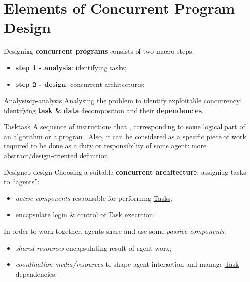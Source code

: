 \chapter{Elements of Concurrent Program Design}\label{chap:ed_elements_of_concurrent_program_design} %
Designing \textbf{concurrent programs} consists of two macro steps:
\begin{itemize}
    \item \textbf{step 1 - analysis}: identifying tasks;
    \item \textbf{step 2 - design}: concurrent architectures;
\end{itemize}
%
\begin{definition}{Analysis}{cp-analysis}
   Analyzing the problem to identify exploitable concurrency: identifying \textbf{task \& data} decomposition and their \textbf{dependencies}.
    \begin{definition}{Task}{task}
        A sequence of instructions that , corresponding to some logical part of an algorithm or a program.
        Also, it can be considered as a specific piece of work required to be done as a duty or responsibility of some agent: more abstract/design-oriented definition.
    \end{definition}
\end{definition}
\begin{definition}{Design}{cp-design}
    Choosing a suitable \textbf{concurrent architecture}, assigning tasks to ``agents'':
    \begin{itemize}
        \item \textit{active components} responsible for performing \hyperref[def:task]{Tasks};
        \item encapsulate login \& control of \hyperref[def:task]{Task} execution;
    \end{itemize}
    In order to work together, agents share and use some \textit{passive components}:
    \begin{itemize}
        \item \textit{shared resources} encapsulating result of agent work;
        \item \textit{coordination media/resources} to shape agent interaction and manage \hyperref[def:task]{Task} dependencies;
    \end{itemize}
\end{definition}
